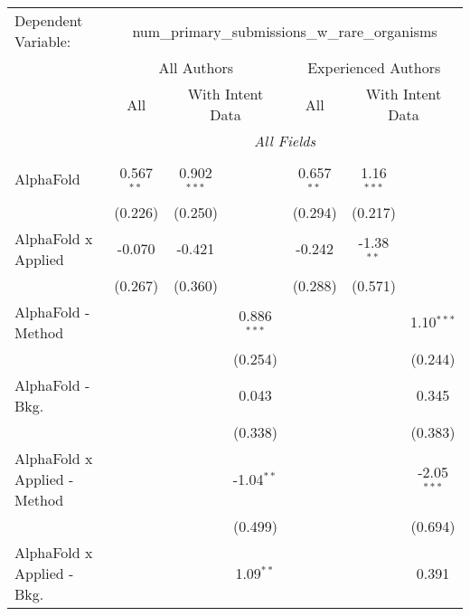 \begingroup
\centering
\begin{tabular}{lcccccc}
   \tabularnewline \midrule \midrule
   Dependent Variable: & \multicolumn{6}{c}{num\_primary\_submissions\_w\_rare\_organisms}\\
 & \multicolumn{3}{c}{All Authors} & \multicolumn{3}{c}{Experienced Authors} \\
\cmidrule(lr){2-4} \cmidrule(lr){5-7}
 & \multicolumn{1}{c}{All} & \multicolumn{2}{c}{With Intent Data} & \multicolumn{1}{c}{All} & \multicolumn{2}{c}{With Intent Data} \\
\cmidrule(lr){2-2} \cmidrule(lr){3-4} \cmidrule(lr){5-5} \cmidrule(lr){6-7}
 & \multicolumn{6}{c}{\textit{All Fields}} \\ \\
   AlphaFold                      & 0.567$^{**}$ & 0.902$^{***}$ &               & 0.657$^{**}$ & 1.16$^{***}$  &   \\   
                                  & (0.226)      & (0.250)       &               & (0.294)      & (0.217)       &   \\   
   AlphaFold x Applied            & -0.070       & -0.421        &               & -0.242       & -1.38$^{**}$  &   \\   
                                  & (0.267)      & (0.360)       &               & (0.288)      & (0.571)       &   \\   
   AlphaFold - Method             &              &               & 0.886$^{***}$ &              &               & 1.10$^{***}$\\   
                                  &              &               & (0.254)       &              &               & (0.244)\\   
   AlphaFold - Bkg.               &              &               & 0.043         &              &               & 0.345\\   
                                  &              &               & (0.338)       &              &               & (0.383)\\   
   AlphaFold x Applied - Method   &              &               & -1.04$^{**}$  &              &               & -2.05$^{***}$\\   
                                  &              &               & (0.499)       &              &               & (0.694)\\   
   AlphaFold x Applied - Bkg.     &              &               & 1.09$^{**}$   &              &               & 0.391\\   

\end{tabular}
